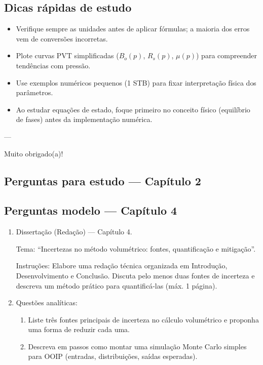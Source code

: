 \documentclass[11pt,a4paper]{article}
\begin{document}
\subsection{Dicas rápidas de estudo}
\begin{itemize}
\item Verifique sempre as unidades antes de aplicar fórmulas; a maioria dos erros vem de conversões incorretas.
\item Plote curvas PVT simplificadas ($B_o(p)$, $R_s(p)$, $\mu(p)$) para compreender tendências com pressão.
\item Use exemplos numéricos pequenos (1 STB) para fixar interpretação física dos parâmetros.
\item Ao estudar equações de estado, foque primeiro no conceito físico (equilíbrio de fases) antes da implementação numérica.
\end{itemize}

---

Muito obrigado(a)!
\clearpage
\subsection*{Perguntas para estudo --- Capítulo 2}

\clearpage
\subsection{Perguntas modelo — Capítulo 4}
\begin{enumerate}
\item Dissertação (Redação) — Capítulo 4.

Tema: ``Incertezas no método volumétrico: fontes, quantificação e mitigação''.

Instruções: Elabore uma redação técnica organizada em Introdução, Desenvolvimento e Conclusão. Discuta pelo menos duas fontes de incerteza e descreva um método prático para quantificá‑las (máx. 1 página).

\vspace{4\baselineskip}
\item Questões analíticas:
\begin{enumerate}[label=\alph*)]
\item Liste três fontes principais de incerteza no cálculo volumétrico e proponha uma forma de reduzir cada uma.
\item Descreva em passos como montar uma simulação Monte Carlo simples para OOIP (entradas, distribuições, saídas esperadas).
\end{enumerate}
\end{enumerate}
\end{document}
